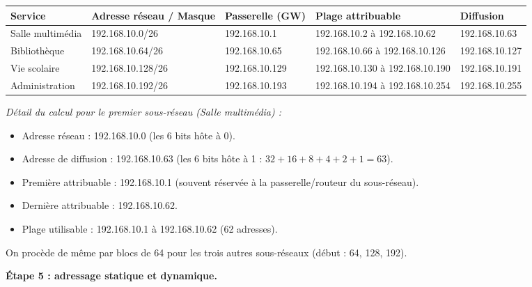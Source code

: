 \documentclass[11pt]{article}
\begin{document}
\begin{exoresolu}
\begin{center}
\begin{tabularx}{\linewidth}{|l|X|X|X|X|}
\hline
\rowcolor{popblueL} \textbf{Service} & \textbf{Adresse réseau / Masque} & \textbf{Passerelle (GW)} & \textbf{Plage attribuable} & \textbf{Diffusion} \\
\hline
Salle multimédia & 192.168.10.0/26 & 192.168.10.1 & 192.168.10.2 à 192.168.10.62 & 192.168.10.63 \\
\hline
Bibliothèque & 192.168.10.64/26 & 192.168.10.65 & 192.168.10.66 à 192.168.10.126 & 192.168.10.127 \\
\hline
Vie scolaire & 192.168.10.128/26 & 192.168.10.129 & 192.168.10.130 à 192.168.10.190 & 192.168.10.191 \\
\hline
Administration & 192.168.10.192/26 & 192.168.10.193 & 192.168.10.194 à 192.168.10.254 & 192.168.10.255 \\
\hline
\end{tabularx}
\end{center}

\textit{Détail du calcul pour le premier sous-réseau (Salle multimédia) :}
\begin{itemize}
\item Adresse réseau : 192.168.10.0 (les 6 bits hôte à 0).
\item Adresse de diffusion : 192.168.10.63 (les 6 bits hôte à 1 : $32+16+8+4+2+1 = 63$).
\item Première attribuable : 192.168.10.1 (souvent réservée à la passerelle/routeur du sous-réseau).
\item Dernière attribuable : 192.168.10.62.
\item Plage utilisable : 192.168.10.1 à 192.168.10.62 (62 adresses).
\end{itemize}
On procède de même par blocs de 64 pour les trois autres sous-réseaux (début : 64, 128, 192).

\textbf{Étape 5 : adressage statique et dynamique.}


\end{exoresolu}
\end{document}
